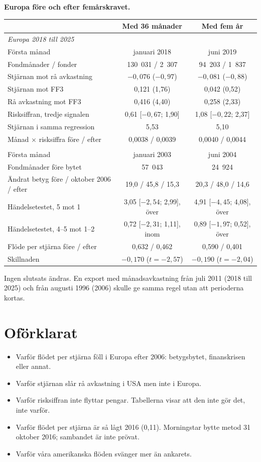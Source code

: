 \documentclass[10pt,a4paper]{article}
\begin{document}
\textbf{Europa före och efter femårskravet.}
\begin{center}\small
\begin{tabular}{lcc}
\toprule
 & Med 36 månader & Med fem år \\
\midrule
\multicolumn{3}{l}{\textit{Europa 2018 till 2025}} \\
Första månad & januari 2018 & juni 2019 \\
Fondmånader / fonder & 130~031 / 2~307 & 94~203 / 1~837 \\
Stjärnan mot rå avkastning & $-0{,}076$ ($-0{,}97$) & $-0{,}081$ ($-0{,}88$) \\
Stjärnan mot FF3 & 0,121 (1,76) & 0,042 (0,52) \\
Rå avkastning mot FF3 & 0,416 (4,40) & 0,258 (2,33) \\
Risksiffran, tredje signalen & 0,61 [$-0{,}67$; 1,90] & 1,08 [$-0{,}22$; 2,37] \\
Stjärnan i samma regression & 5,53 & 5,10 \\
Månad $\times$ risksiffra före / efter & 0,0038 / 0,0039 & 0,0040 / 0,0044 \\
\addlinespace
\multicolumn{3}{l}{\textit{Europa 2006}} \\
Första månad & januari 2003 & juni 2004 \\
Fondmånader före bytet & 57~043 & 24~924 \\
Ändrat betyg före / oktober 2006 / efter & 19,0 / 45,8 / 15,3 & 20,3 / 48,0 / 14,6 \\
Händelsetestet, 5 mot 1 & 3,05 [$-2{,}54$; 2,99], över & 4,91 [$-4{,}45$; 4,08], över \\
Händelsetestet, 4--5 mot 1--2 & 0,72 [$-2{,}31$; 1,11], inom & 0,89 [$-1{,}97$; 0,52], över \\
Flöde per stjärna före / efter & 0,632 / 0,462 & 0,590 / 0,401 \\
Skillnaden & $-0{,}170$ ($t=-2{,}57$) & $-0{,}190$ ($t=-2{,}04$) \\
\bottomrule
\end{tabular}
\end{center}
Ingen slutsats ändras. En export med månadsavkastning från juli 2011 (2018 till 2025) och från augusti 1996 (2006) skulle ge samma regel utan att perioderna kortas.

\section{Oförklarat}
\begin{itemize}[leftmargin=*,itemsep=1pt]
\item Varför flödet per stjärna föll i Europa efter 2006: betygsbytet, finanskrisen eller annat.
\item Varför stjärnan slår rå avkastning i USA men inte i Europa.
\item Varför risksiffran inte flyttar pengar. Tabellerna visar att den inte gör det, inte varför.
\item Varför flödet per stjärna är så lågt 2016 (0,11). Morningstar bytte metod 31 oktober 2016; sambandet är inte prövat.
\item Varför våra amerikanska flöden svänger mer än ankarets.
\end{itemize}
\end{document}
